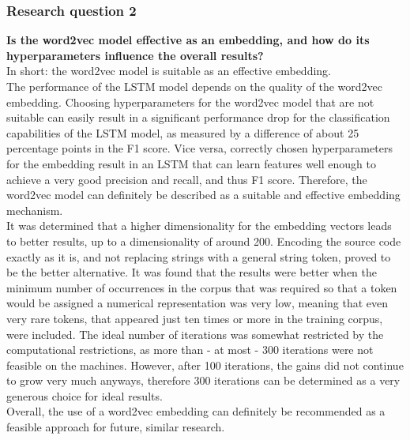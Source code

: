 \documentclass[
a4paper,
pagesize,
pdftex,
12pt,
twoside, %
BCOR=5mm, %
ngerman,
fleqn,
final,
]{scrartcl}
\begin{document}
	\subsubsection{Research question 2}
	\textbf{Is the word2vec model effective as an embedding, and how do its hyperparameters influence the overall results?}\\
	In short: the word2vec model is suitable as an effective embedding.\\
	The performance of the LSTM model depends on the quality of the word2vec embedding. Choosing hyperparameters for the word2vec model that are not suitable can easily result in a significant performance drop for the classification capabilities of the LSTM model, as measured by a difference of about 25 percentage points in the F1 score. Vice versa, correctly chosen hyperparameters for the embedding result in an LSTM that can learn features well enough to achieve a very good precision and recall, and thus F1 score. Therefore, the word2vec model can definitely be described as a suitable and effective embedding mechanism.\\
	It was determined that a higher dimensionality for the embedding vectors leads to better results, up to a dimensionality of around 200. Encoding the source code exactly as it is, and not replacing strings with a general string token, proved to be the better alternative. It was found that the results were better when the minimum number of occurrences in the corpus that was required so that a token would be assigned a numerical representation was very low, meaning that even very rare tokens, that appeared just ten times or more in the training corpus, were included. The ideal number of iterations was somewhat restricted by the computational restrictions, as more than - at most - 300 iterations were not feasible on the machines. However, after 100 iterations, the gains did not continue to grow very much anyways, therefore 300 iterations can be determined as a very generous choice for ideal results.\\
	Overall, the use of a word2vec embedding can definitely be recommended as a feasible approach for future, similar research. 
	
\end{document}
